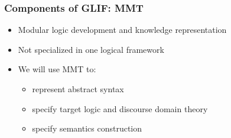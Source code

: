 \begin{frame}[fragile]
    \frametitle{Components of GLIF: MMT}
    \lstset{frame=single}
    \begin{itemize}   
        \item Modular logic development and knowledge representation
        \item Not specialized in one logical framework 
        \item We will use MMT to:
        \begin{itemize}
            \item {  represent abstract syntax }
            \item {  specify target logic and discourse domain theory}
            \item {  specify semantics construction}
        \end{itemize}
    \end{itemize}
    \lstset{basicstyle=\footnotesize\ttfamily}
    
    \vspace{1em}
    \begin{minipage}[t][4cm]{\textwidth}
        \centering
    \end{minipage}
\end{frame}

